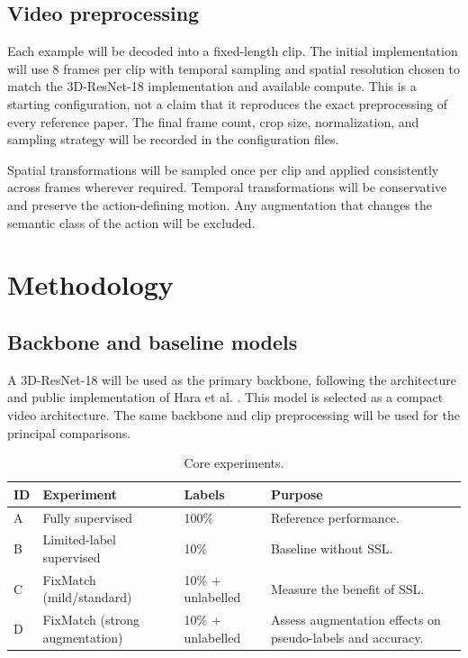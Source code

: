 \documentclass[11pt,a4paper]{article}
\begin{document}
\subsection{Video preprocessing}
Each example will be decoded into a fixed-length clip. The initial implementation will use 8 frames per clip with temporal sampling and spatial resolution chosen to match the 3D-ResNet-18 implementation and available compute. This is a starting configuration, not a claim that it reproduces the exact preprocessing of every reference paper. The final frame count, crop size, normalization, and sampling strategy will be recorded in the configuration files.

Spatial transformations will be sampled once per clip and applied consistently across frames wherever required. Temporal transformations will be conservative and preserve the action-defining motion. Any augmentation that changes the semantic class of the action will be excluded.

\section{Methodology}
\subsection{Backbone and baseline models}
A 3D-ResNet-18 will be used as the primary backbone, following the architecture and public implementation of Hara et al. \cite{hara3dresnet}. This model is selected as a compact video architecture. The same backbone and clip preprocessing will be used for the principal comparisons.


\begin{table}[H]
\centering
\small
\caption{Core experiments.}
\begin{tabularx}{\textwidth}{L{0.6cm}L{3.2cm}L{2.6cm}Y}
\toprule
\textbf{ID} & \textbf{Experiment} & \textbf{Labels} & \textbf{Purpose} \\
\midrule
A & Fully supervised & 100\% & Reference performance. \\
B & Limited-label supervised & 10\% & Baseline without SSL. \\
C & FixMatch (mild/standard) & 10\% + unlabelled & Measure the benefit of SSL. \\
D & FixMatch (strong augmentation) & 10\% + unlabelled & Assess augmentation effects on pseudo-labels and accuracy. \\
\bottomrule
\end{tabularx}
\end{table}
\end{document}
